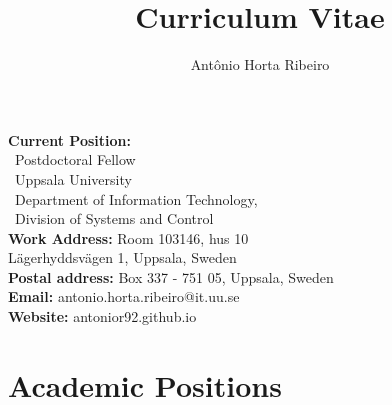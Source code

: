 \documentclass[10pt,letterpaper]{article} %
\title{Curriculum Vitae}
\author{Ant\^onio Horta Ribeiro}
\begin{document}
\maketitle

\begin{tcolorbox}[standard jigsaw, opacityback=0]
    \vspace{-4pt}
\begin{multicols}{2}
    \small
    \textbf{Current Position:}\\
    \, Postdoctoral Fellow\\
    \, Uppsala University \\
    \, Department of Information Technology,\\
    \, Division of Systems and Control\\
    {\bf Work Address:} Room 103146, hus 10 \\
    \phantom{\bf Work address:} Lägerhyddsvägen 1, Uppsala, Sweden\\
    {\bf Postal address:} Box 337 - 751 05, Uppsala, Sweden\\
    {\bf Email:} antonio.horta.ribeiro@it.uu.se\\
    {\bf Website:} antonior92.github.io
\end{multicols}
\end{tcolorbox}

\section*{Academic Positions} %
\end{document}
